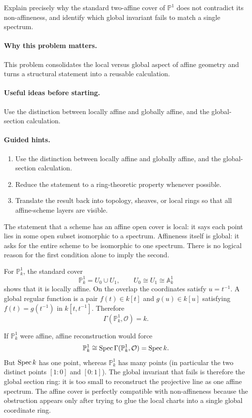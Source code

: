 \begin{problem}\label{prob:vi18-p20}
Explain precisely why the standard two-affine cover of $\mathbb P^1$ does not contradict its non-affineness, and identify which global invariant fails to match a single spectrum.
\end{problem}

\ifdefined\FullProblemDossiers
\paragraph{Why this problem matters.}
This problem consolidates the local versus global aspect of affine geometry and turns a structural statement into a reusable calculation.

\paragraph{Useful ideas before starting.}
Use the distinction between locally affine and globally affine, and the global-section calculation.

\paragraph{Guided hints.}
\begin{enumerate}
\item Use the distinction between locally affine and globally affine, and the global-section calculation.
\item Reduce the statement to a ring-theoretic property whenever possible.
\item Translate the result back into topology, sheaves, or local rings so that all affine-scheme layers are visible.
\end{enumerate}

\begin{solution}
The statement that a scheme has an affine open cover is local: it says each point lies in some open subset isomorphic to a spectrum. Affineness itself is global: it asks for the entire scheme to be isomorphic to one spectrum. There is no logical reason for the first condition alone to imply the second.

For $\mathbb P^1_k$, the standard cover
\[
\mathbb P^1_k=U_0\cup U_1,
\qquad
U_0\cong U_1\cong\mathbb A^1_k
\]
shows that it is locally affine. On the overlap the coordinates satisfy $u=t^{-1}$. A global regular function is a pair $f(t)\in k[t]$ and $g(u)\in k[u]$ satisfying $f(t)=g(t^{-1})$ in $k[t,t^{-1}]$. Therefore
\[
\Gamma(\mathbb P^1_k,\mathcal O)=k.
\]

If $\mathbb P^1_k$ were affine, affine reconstruction would force
\[
\mathbb P^1_k\cong\operatorname{Spec}\Gamma(\mathbb P^1_k,\mathcal O)=\operatorname{Spec} k.
\]
But $\operatorname{Spec} k$ has one point, whereas $\mathbb P^1_k$ has many points (in particular the two distinct points $[1:0]$ and $[0:1]$). The global invariant that fails is therefore the global section ring: it is too small to reconstruct the projective line as one affine spectrum. The affine cover is perfectly compatible with non-affineness because the obstruction appears only after trying to glue the local charts into a single global coordinate ring.
\end{solution}


